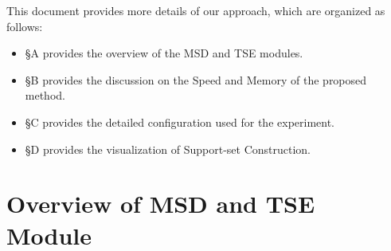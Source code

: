 This document provides more details of our approach, which are organized as follows:
 {
\begin{itemize}
 \item \S A provides the overview of the MSD and TSE modules.
 \item \S B provides the discussion on the Speed and Memory of the proposed method.
 \item \S C provides the detailed configuration used for the experiment.
 \item \S D provides the visualization of Support-set Construction.
\end{itemize}
}



\section{Overview of MSD and TSE Module}

